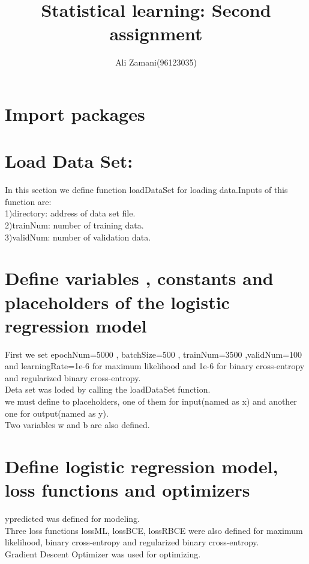 \documentclass[17pt]{report}
\title{
	{\large Statistical learning: Second assignment}\\}
\author{Ali Zamani(96123035)}
\begin{document}
\maketitle

\newpage
\section{Import packages}

\section{Load Data Set:}
In this section we define function loadDataSet for loading data.Inputs of this function are:\\
1)directory: address of data set file.\\
2)trainNum:  number of training data.\\
3)validNum:  number of validation data.\\

\section{Define variables , constants and placeholders of the logistic regression model}
First we set epochNum=5000 , batchSize=500 , trainNum=3500 ,validNum=100 and learningRate=1e-6 for 
maximum likelihood and 1e-6 for binary cross-entropy and regularized binary cross-entropy. \\
Deta set was loded by calling the  loadDataSet function.\\
we must define to placeholders, one of them for input(named as x) and another one for output(named as y).\\
Two variables w and b are also defined.\\
 
\section{Define logistic regression model, loss functions and optimizers}
ypredicted was defined for modeling.\\
Three loss functions lossML, lossBCE, lossRBCE were also defined for maximum likelihood, binary cross-entropy and regularized binary cross-entropy.\\
Gradient Descent Optimizer was used for optimizing.\\
 
\end{document}
